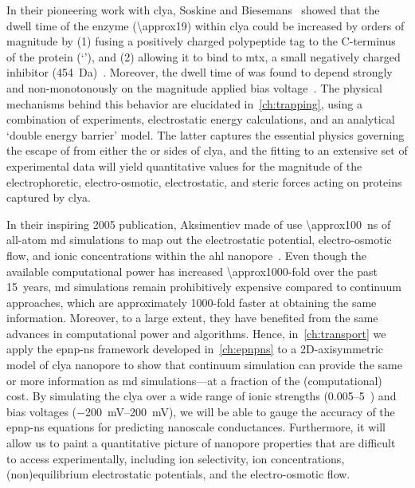 \clearpage

%
%

In their pioneering work with \gls{clya}, Soskine and Biesemans~\etal{} showed that the dwell time of the
 enzyme (\SI{\approx19}{\kDa}) within \gls{clya} could be increased by orders of magnitude by
(1) fusing a positively charged polypeptide tag to the C-terminus of the protein (`\DHFRt'), and (2) allowing
it to bind to \gls{mtx}, a small negatively charged inhibitor
(\SI{454}{\dalton})~\cite{Soskine-Biesemans-2015}. Moreover, the dwell time of \DHFRt was found to depend
strongly and non-monotonously on the magnitude applied bias voltage~\cite{Biesemans-2015}. The physical
mechanisms behind this behavior are elucidated in~\cref{ch:trapping}, using a combination of experiments,
electrostatic energy calculations, and an analytical `double energy barrier' model. The latter captures the
essential physics governing the escape of \DHFRt{} from either the \cisi{} or \transi{} sides of \gls{clya},
and the fitting to an extensive set of experimental data will yield quantitative values for the magnitude of the
electrophoretic, electro-osmotic, electrostatic, and steric forces acting on proteins captured by \gls{clya}.


%
%

In their inspiring 2005 publication, Aksimentiev \etal{} made of use \SI{\approx100}{\ns} of all-atom \gls{md}
simulations to map out the electrostatic potential, electro-osmotic flow, and ionic concentrations within the
\gls{ahl} nanopore~\cite{Aksimentiev-2005}. Even though the available computational power has increased
\num{\approx1000}-fold over the past 15~years, \gls{md} simulations remain prohibitively expensive compared to
continuum approaches, which are approximately 1000-fold faster at obtaining the same information. Moreover, to
a large extent, they have benefited from the same advances in computational power and algorithms. Hence,
in~\cref{ch:transport} we apply the \gls{epnp-ns} framework developed in~\cref{ch:epnpns} to a 2D-axisymmetric
model of \gls{clya} nanopore to show that continuum simulation can provide the same or more information as
\gls{md} simulations---at a fraction of the (computational) cost. By simulating the \gls{clya} over a wide
range of ionic strengths (\SIrange{0.005}{5}{\Molar}~) and bias voltages
(\SIrange{-200}{+200}{\mV}), we will be able to gauge the accuracy of the
\gls{epnp-ns} equations for predicting nanoscale conductances. Furthermore, it will allow us to paint a
quantitative picture of nanopore properties that are difficult to access experimentally, including ion
selectivity, ion concentrations, (non)equilibrium electrostatic potentials, and the electro-osmotic flow.


\cleardoublepage

